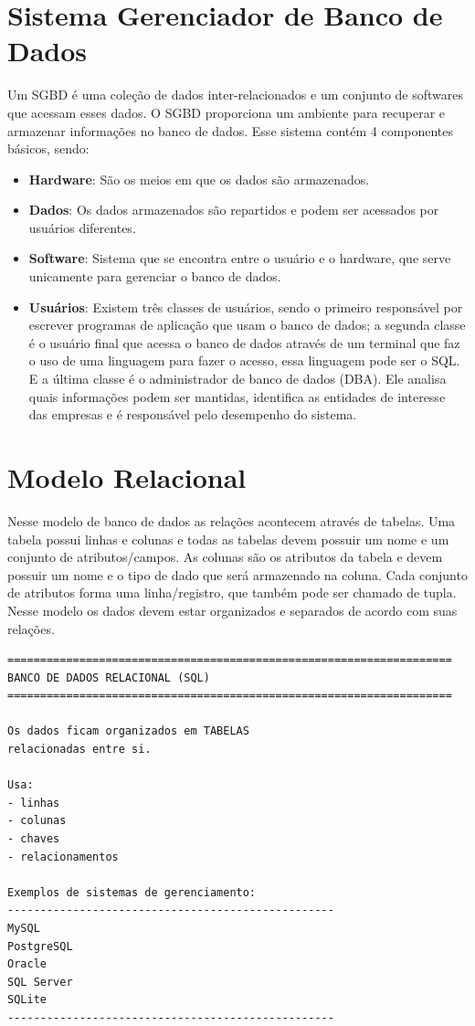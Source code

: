 \documentclass[12pt,a4paper]{article}
\begin{document}
\section*{Sistema Gerenciador de Banco de Dados}

Um SGBD é uma coleção de dados inter-relacionados e um conjunto de softwares que acessam esses dados. O SGBD proporciona um ambiente para recuperar e armazenar informações no banco de dados. Esse sistema contém 4 componentes básicos, sendo:

\begin{itemize}
    \item \textbf{Hardware}: São os meios em que os dados são armazenados.
    
    \item \textbf{Dados}: Os dados armazenados são repartidos e podem ser acessados por usuários diferentes.
    
    \item \textbf{Software}: Sistema que se encontra entre o usuário e o hardware, que serve unicamente para gerenciar o banco de dados.
    
    \item \textbf{Usuários}: Existem três classes de usuários, sendo o primeiro responsável por escrever programas de aplicação que usam o banco de dados; a segunda classe é o usuário final que acessa o banco de dados através de um terminal que faz o uso de uma linguagem para fazer o acesso, essa linguagem pode ser o SQL. E a última classe é o administrador de banco de dados (DBA). Ele analisa quais informações podem ser mantidas, identifica as entidades de interesse das empresas e é responsável pelo desempenho do sistema.
\end{itemize}

\section*{Modelo Relacional}

Nesse modelo de banco de dados as relações acontecem através de tabelas. Uma tabela possui linhas e colunas e todas as tabelas devem possuir um nome e um conjunto de atributos/campos. As colunas são os atributos da tabela e devem possuir um nome e o tipo de dado que será armazenado na coluna. Cada conjunto de atributos forma uma linha/registro, que também pode ser chamado de tupla. Nesse modelo os dados devem estar organizados e separados de acordo com suas relações.

\begin{verbatim}
====================================================================
BANCO DE DADOS RELACIONAL (SQL)
====================================================================

Os dados ficam organizados em TABELAS
relacionadas entre si.

Usa:
- linhas
- colunas
- chaves
- relacionamentos

Exemplos de sistemas de gerenciamento:
--------------------------------------------------
MySQL
PostgreSQL
Oracle
SQL Server
SQLite
--------------------------------------------------
\end{verbatim}
\end{document}
